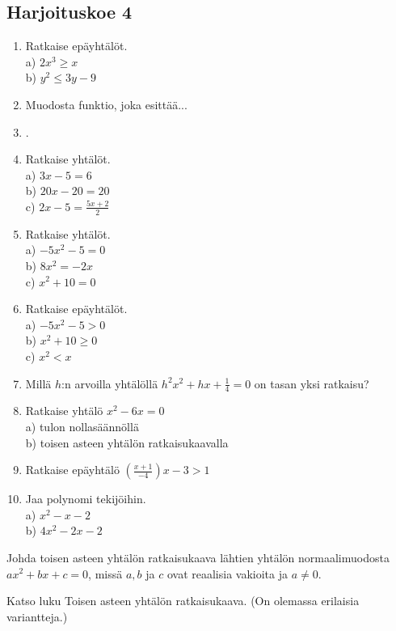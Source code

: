 \subsection*{Harjoituskoe 4}

\begin{enumerate}
\item Ratkaise epäyhtälöt. \\
a) $2x^3 \geq x$ \\
b) $y^2 \leq 3y -9 $

\item Muodosta funktio, joka esittää...

\item .
\item Ratkaise yhtälöt.\\ a) $3x-5=6$\\ b) $20x-20=20$\\ c) $2x-5=\frac{5x+2}{2}$
\item Ratkaise yhtälöt.\\ a) $-5x^2-5=0$\\ b) $8x^2=-2x$\\ c) $x^2+10=0$
\item Ratkaise epäyhtälöt.\\ a) $-5x^2-5>0$\\ b) $x^2+10\geq0$\\ c) $x^2<x$
\item Millä $h$:n arvoilla yhtälöllä $h^2x^2+hx+\frac{1}{4}=0$ on tasan yksi ratkaisu?
\item Ratkaise yhtälö $x^2-6x=0$\\ a) tulon nollasäännöllä\\ b) toisen asteen yhtälön ratkaisukaavalla
\item Ratkaise epäyhtälö $(\frac{x+1}{-4})x-3>1$
\item Jaa polynomi tekijöihin.\\ a) $x^2-x-2$\\ b) $4x^2-2x-2$
\end{enumerate}



\begin{tehtava}
Johda toisen asteen yhtälön ratkaisukaava lähtien yhtälön normaalimuodosta $ax^2+bx+c=0$, missä $a, b$ ja $c$ ovat reaalisia vakioita ja $a \neq 0$.
	\begin{vastaus}
	Katso luku Toisen asteen yhtälön ratkaisukaava. (On olemassa erilaisia variantteja.)
	\end{vastaus}
\end{tehtava}

